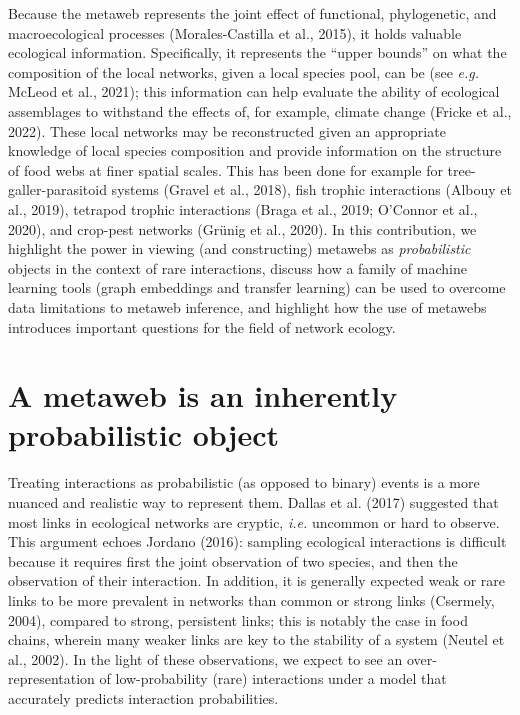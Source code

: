 \documentclass[11pt]{article}
\begin{document}
Because the metaweb represents the joint effect of functional,
phylogenetic, and macroecological processes (Morales-Castilla et al.,
2015), it holds valuable ecological information. Specifically, it
represents the ``upper bounds'' on what the composition of the local
networks, given a local species pool, can be (see \emph{e.g.} McLeod et
al., 2021); this information can help evaluate the ability of ecological
assemblages to withstand the effects of, for example, climate change
(Fricke et al., 2022). These local networks may be reconstructed given
an appropriate knowledge of local species composition and provide
information on the structure of food webs at finer spatial scales. This
has been done for example for tree-galler-parasitoid systems (Gravel et
al., 2018), fish trophic interactions (Albouy et al., 2019), tetrapod
trophic interactions (Braga et al., 2019; O'Connor et al., 2020), and
crop-pest networks (Grünig et al., 2020). In this contribution, we
highlight the power in viewing (and constructing) metawebs as
\emph{probabilistic} objects in the context of rare interactions,
discuss how a family of machine learning tools (graph embeddings and
transfer learning) can be used to overcome data limitations to metaweb
inference, and highlight how the use of metawebs introduces important
questions for the field of network ecology.

\hypertarget{a-metaweb-is-an-inherently-probabilistic-object}{%
\section{A metaweb is an inherently probabilistic
object}\label{a-metaweb-is-an-inherently-probabilistic-object}}

Treating interactions as probabilistic (as opposed to binary) events is
a more nuanced and realistic way to represent them. Dallas et al. (2017)
suggested that most links in ecological networks are cryptic,
\emph{i.e.} uncommon or hard to observe. This argument echoes Jordano
(2016): sampling ecological interactions is difficult because it
requires first the joint observation of two species, and then the
observation of their interaction. In addition, it is generally expected
weak or rare links to be more prevalent in networks than common or
strong links (Csermely, 2004), compared to strong, persistent links;
this is notably the case in food chains, wherein many weaker links are
key to the stability of a system (Neutel et al., 2002). In the light of
these observations, we expect to see an over-representation of
low-probability (rare) interactions under a model that accurately
predicts interaction probabilities.
\end{document}
